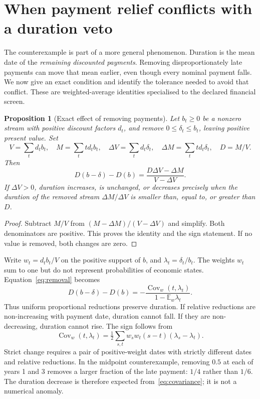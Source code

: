 \documentclass[11pt,a4paper]{article}
\newtheorem{proposition}[theorem]{Proposition}
\begin{document}
\section{When payment relief conflicts with a duration veto}\label{sec:removal}
The counterexample is part of a more general phenomenon. Duration is the mean date of the \emph{remaining discounted payments}. Removing disproportionately late payments can move that mean earlier, even though every nominal payment falls. We now give an exact condition and identify the tolerance needed to avoid that conflict. These are weighted-average identities specialised to the declared financial screen.

\begin{proposition}[Exact effect of removing payments]\label{prop:removal}
Let $b_t\geq0$ be a nonzero stream with positive discount factors $d_t$, and remove $0\leq\delta_t\leq b_t$, leaving positive present value. Set
\[
V=\sum_t d_tb_t,\quad M=\sum_ttd_tb_t,\quad
\Delta V=\sum_td_t\delta_t,\quad\Delta M=\sum_ttd_t\delta_t,\quad D=M/V.
\]
Then
\begin{equation}\label{eq:removal}
D(b-\delta)-D(b)=\frac{D\Delta V-\Delta M}{V-\Delta V}.
\end{equation}
If $\Delta V>0$, duration increases, is unchanged, or decreases precisely when the duration of the removed stream $\Delta M/\Delta V$ is smaller than, equal to, or greater than $D$.
\end{proposition}
\begin{proof}
Subtract $M/V$ from $(M-\Delta M)/(V-\Delta V)$ and simplify. Both denominators are positive. This proves the identity and the sign statement. If no value is removed, both changes are zero.
\end{proof}

Write $w_t=d_tb_t/V$ on the positive support of $b$, and $\lambda_t=\delta_t/b_t$. The weights $w_t$ sum to one but do not represent probabilities of economic states. Equation~\eqref{eq:removal} becomes
\begin{equation}\label{eq:covariance}
D(b-\delta)-D(b)=-\frac{\operatorname{Cov}_{w}(t,\lambda_t)}{1-\mathbb E_w\lambda_t}.
\end{equation}
Thus uniform proportional reductions preserve duration. If relative reductions are non-increasing with payment date, duration cannot fall. If they are non-decreasing, duration cannot rise. The sign follows from
\[
\operatorname{Cov}_w(t,\lambda_t)=\tfrac12\sum_{s,t}w_sw_t(s-t)(\lambda_s-\lambda_t).
\]
Strict change requires a pair of positive-weight dates with strictly different dates and relative reductions. In the midpoint counterexample, removing $0.5$ at each of years 1 and 3 removes a larger fraction of the late payment: $1/4$ rather than $1/6$. The duration decrease is therefore expected from~\eqref{eq:covariance}; it is not a numerical anomaly.
\end{document}
